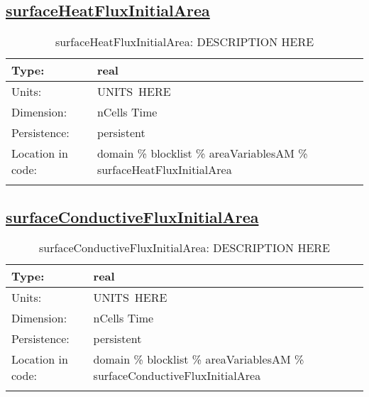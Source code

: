 \subsection[surfaceHeatFluxInitialArea]{\hyperref[sec:var_tab_areaVariablesAM]{surfaceHeatFluxInitialArea}}
\label{subsec:var_sec_areaVariablesAM_surfaceHeatFluxInitialArea}
\begin{center}
\begin{longtable}{| p{2.0in} | p{4.0in} |}
        \hline 
        Type: & real \\
        \hline 
        Units: & \si{UNITS.HERE} \\
        \hline 
        Dimension: & nCells Time \\
        \hline 
        Persistence: & persistent \\
        \hline 
         Location in code: & domain \% blocklist \% areaVariablesAM \% surfaceHeatFluxInitialArea \\
         \hline 
    \caption{surfaceHeatFluxInitialArea: DESCRIPTION HERE}
\end{longtable}
\end{center}
\subsection[surfaceConductiveFluxInitialArea]{\hyperref[sec:var_tab_areaVariablesAM]{surfaceConductiveFluxInitialArea}}
\label{subsec:var_sec_areaVariablesAM_surfaceConductiveFluxInitialArea}
\begin{center}
\begin{longtable}{| p{2.0in} | p{4.0in} |}
        \hline 
        Type: & real \\
        \hline 
        Units: & \si{UNITS.HERE} \\
        \hline 
        Dimension: & nCells Time \\
        \hline 
        Persistence: & persistent \\
        \hline 
         Location in code: & domain \% blocklist \% areaVariablesAM \% surfaceConductiveFluxInitialArea \\
         \hline 
    \caption{surfaceConductiveFluxInitialArea: DESCRIPTION HERE}
\end{longtable}
\end{center}
